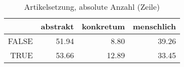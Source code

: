\begin{table}[ht]
\centering
\begin{tabular}{rrrr}
  \hline
 & abstrakt & konkretum & menschlich \\ 
  \hline
FALSE & 51.94 & 8.80 & 39.26 \\ 
  TRUE & 53.66 & 12.89 & 33.45 \\ 
   \hline
\end{tabular}
\caption{Artikelsetzung, absolute Anzahl (Zeile)} 
\end{table}
